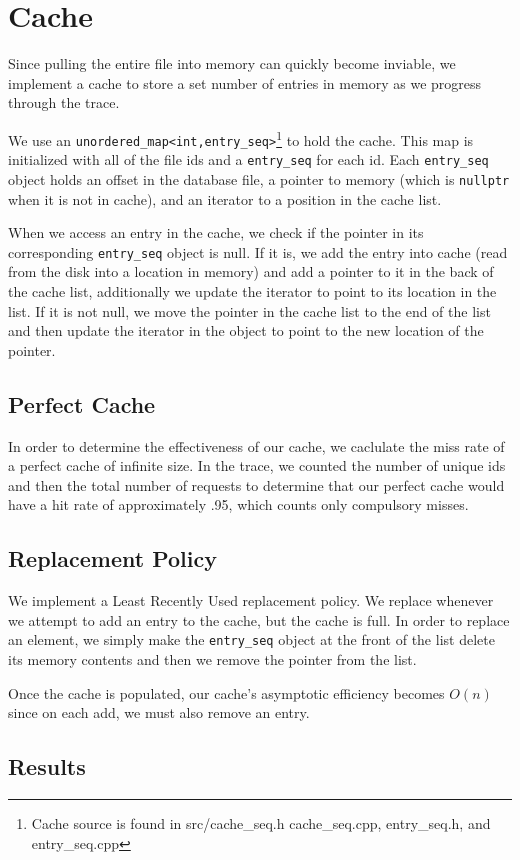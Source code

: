 \documentclass[notitlepage, twocolumn]{article}
\begin{document}
\section{Cache}

Since pulling the entire file into memory can quickly become inviable, we implement a cache to store a set number of entries in memory as we progress through the trace.

We use an \verb|unordered_map<int,entry_seq>|\footnote{Cache source is found in src/cache\_seq.h cache\_seq.cpp, entry\_seq.h, and entry\_seq.cpp} to hold the cache.
This map is initialized with all of the file ids and a \verb|entry_seq| for each id.
Each \verb|entry_seq| object holds an offset in the database file, a pointer to memory (which is \verb|nullptr| when it is not in cache), and an iterator to a position in the cache list.

When we access an entry in the cache, we check if the pointer in its corresponding \verb|entry_seq| object is null.
If it is, we add the entry into cache (read from the disk into a location in memory) and add a pointer to it in the back of the cache list, additionally we update the iterator to point to its location in the list.
If it is not null, we move the pointer in the cache list to the end of the list and then update the iterator in the object to point to the new location of the pointer.

\subsection{Perfect Cache}

In order to determine the effectiveness of our cache, we caclulate the miss rate of a perfect cache of infinite size.
In the trace, we counted the number of unique ids and then the total number of requests to determine that our perfect cache would have a hit rate of approximately .95, which counts only compulsory misses.

\subsection{Replacement Policy}

We implement a Least Recently Used replacement policy.
We replace whenever we attempt to add an entry to the cache, but the cache is full.
In order to replace an element, we simply make the \verb|entry_seq| object at the front of the list delete its memory contents and then we remove the pointer from the list.

Once the cache is populated, our cache's asymptotic efficiency becomes $O(n)$ since on each add, we must also remove an entry.

\subsection{Results}
\end{document}
